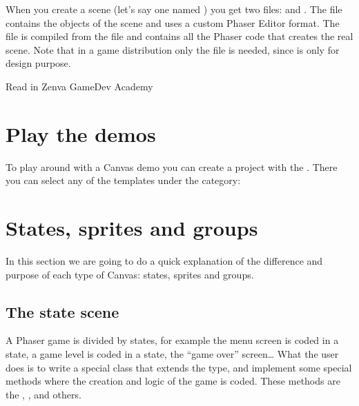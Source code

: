 \documentclass[letterpaper,10pt,english]{sphinxmanual}
\begin{document}
When you create a scene (let’s say one named ) you get two files:  and . The  file contains the objects of the scene and uses a custom Phaser Editor format. The  file is compiled from the  file and contains all the Phaser code that creates the real scene. Note that in a game distribution only the  file is needed, since  is only for design purpose.

Read in Zenva GameDev Academy 

\noindent{}


\section{Play the demos}
\label{\detokenize{canvas:play-the-demos}}
To play around with a Canvas demo you can create a project with the . There you can select any of the templates under the  category:

\noindent{}


\section{States, sprites and groups}
\label{\detokenize{canvas:states-sprites-and-groups}}
In this section we are going to do a quick explanation of the difference and purpose of each type of Canvas: states, sprites and groups.


\subsection{The state scene}
\label{\detokenize{canvas:the-state-scene}}
A Phaser game is divided by states, for example the menu screen is coded in a state, a game level is coded in a state, the “game over” screen… What the user does is to write a special class that extends the  type, and implement some special methods where the creation and logic of the game is coded. These methods are the , ,  and others.
\end{document}
